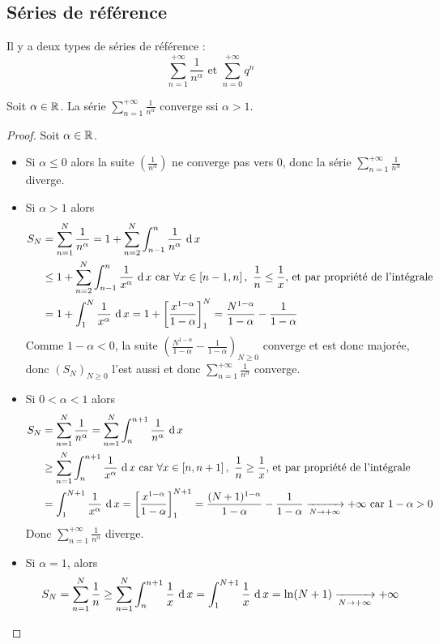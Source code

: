 \subsection*{Séries de référence}
Il y a deux types de séries de référence : $$\sum_{n = 1}^{+\infty}\frac 1{n^\alpha}\text{ et }\sum_{n=0}^{+\infty}q^n$$
\begin{proposition}
    Soit $\alpha\in\mathbb{R}$. La série $\sum_{n=1}^{+\infty}\frac{1}{n^\alpha}$ converge ssi $\alpha > 1$.
\end{proposition}
\begin{proof}
    Soit $\alpha\in\mathbb{R}$.
    \begin{itemize}
        \item Si $\alpha\le 0$ alors la suite $\left(\frac1{n^\alpha}\right)$ ne converge pas vers $0$, donc la série $\sum_{n=1}^{+\infty}\frac{1}{n^\alpha}$ diverge.
        \item Si $\alpha >1$ alors \begin{align*}
            S_N &= \sum_{n=1}^{N}\frac{1}{n^\alpha} =1 + \sum_{n = 2}^N\int_{n-1}^n\frac 1{n^\alpha}\,\operatorname{d} x\\
            &\le 1 + \sum_{n = 2}^N\int_{n-1}^n\frac 1{x^\alpha}\,\operatorname{d} x\text{ car $\forall x\in\left[ n-1,n\right],\ \frac 1 n\le\frac 1 x$, et par propriété de l'intégrale}\\
            &= 1 + \int_{1}^N\frac 1{x^\alpha}\,\operatorname{d} x = 1 + \left[\frac{x^{1-\alpha}}{1-\alpha}\right]_1^N = \frac{N^{1-\alpha}}{1-\alpha}- \frac{1}{1-\alpha}
        \end{align*}
        Comme $1-\alpha <0$, la suite $(\frac{N^{1-\alpha}}{1-\alpha}- \frac{1}{1-\alpha})_{N\ge 0}$ converge et est donc majorée, donc $(S_N)_{N\ge 0}$ l'est aussi et donc $\sum_{n=1}^{+\infty}\frac{1}{n^\alpha}$ converge.
        \item Si $0<\alpha<1$ alors \begin{align*}
            S_N &= \sum_{n=1}^{N}\frac{1}{n^\alpha} = \sum_{n = 1}^N\int_{n}^{n+1}\frac 1{n^\alpha}\,\operatorname{d} x\\
            &\ge \sum_{n = 1}^N\int_{n}^{n+1}\frac 1{x^\alpha}\,\operatorname{d} x\text{ car $\forall x\in\left[ n,n+1\right],\ \frac 1 n\ge\frac 1 x$, et par propriété de l'intégrale}\\
            &= \int_{1}^{N+1}\frac 1{x^\alpha}\,\operatorname{d} x =\left[\frac{x^{1-\alpha}}{1-\alpha}\right]_1^{N+1} = \frac{(N+1)^{1-\alpha}}{1-\alpha}- \frac{1}{1-\alpha}\xrightarrow[N\to+\infty]{} + \infty \text{ car $1-\alpha >0$}
        \end{align*}
        Donc $\sum_{n=1}^{+\infty}\frac1{n^\alpha}$ diverge.
        \item Si $\alpha = 1$, alors $$S_N = \sum_{n = 1}^N\frac 1 n\ge\sum_{n = 1}^N\int_n^{n+1}\frac1x\,\operatorname{d} x = \int_1^{N+1}\frac 1 x \,\operatorname{d} x= \ln(N+1)\xrightarrow[N\to+\infty]{}+\infty$$
    \end{itemize}
\end{proof}

